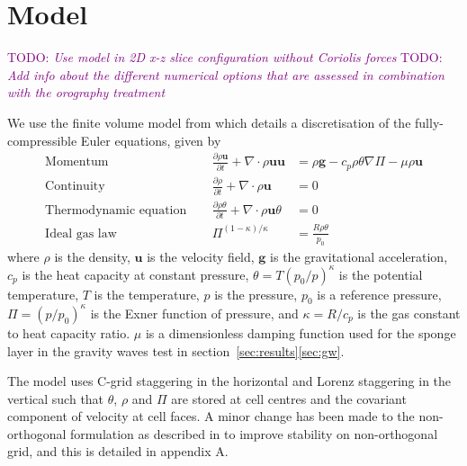 \documentclass{ametsoc}
\newcommand{\TODO}[1]{\textcolor{purple}{TODO: \emph{#1}}}
\begin{document}
\section{Model}
\label{sec:model}
\TODO{Use model in 2D x-z slice configuration without Coriolis forces}
\TODO{Add info about the different numerical options that are assessed in combination with the orography treatment}

We use the finite volume model from \citet{weller-shahrokhi2014} which details a discretisation of the fully-compressible Euler equations, given by
\begin{subequations}
\begin{align}
	\text{Momentum} &\ &\  	\frac{\partial \rho \bm{u}}{\partial t} + \nabla \cdot \rho \bm{uu} &= \rho \bm{g} - c_p \rho \theta \nabla \Pi - \mu \rho \bm{u} \label{eq:momentum} \\
	\text{Continuity} &\ &\	\frac{\partial \rho}{\partial t} + \nabla \cdot \rho \bm{u} &= 0 \\
	\text{Thermodynamic equation} &\ &\ \frac{\partial \rho \theta}{\partial t} + \nabla \cdot \rho \bm{u} \theta &= 0 \\
	\text{Ideal gas law} &\ &\ \Pi^{(1 - \kappa)/\kappa} &= \frac{R \rho \theta}{p_0}
\end{align}
\end{subequations}
where \(\rho\) is the density, \(\bm{u}\) is the velocity field, \(\bm{g}\) is the gravitational acceleration, \(c_p\) is the heat capacity at constant pressure, \(\theta = T \left(p_0/p\right)^\kappa\) is the potential temperature, \(T\) is the temperature, \(p\) is the pressure, \(p_0\) is a reference pressure, \(\Pi = \left(p / p_0 \right)^\kappa\) is the Exner function of pressure, and \(\kappa = R/c_p\) is the gas constant to heat capacity ratio.  \(\mu\) is a dimensionless damping function used for the sponge layer in the gravity waves test in section~\ref{sec:results}\ref{sec:gw}.

The model uses C-grid staggering in the horizontal and Lorenz staggering in the vertical such that $\theta$, $\rho$ and $\Pi$ are stored at cell centres and the covariant component of velocity at cell faces.
A minor change has been made to the non-orthogonal formulation as described in \citet{weller-shahrokhi2014} to improve stability on non-orthogonal grid, and this is detailed in appendix A.
\end{document}
